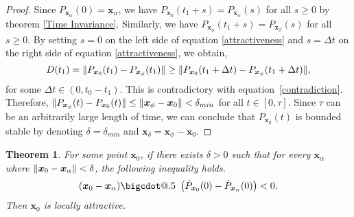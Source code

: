\documentclass{article}
\makeatletter
\newcommand{\B}[1]{\boldsymbol{#1}}
\newcommand*\bigcdot{\mathpalette\bigcdot@{.5}}
\newcommand*\bigcdot@[2]{\mathbin{\vcenter{\hbox{\scalebox{#2}{$\m@th#1\bullet$}}}}}
\DeclarePairedDelimiter\norm{\lVert}{\rVert}%
\newtheorem{theorem}{Theorem}[section]
\theoremstyle{definition}
\theoremstyle{remark}
\makeatother
\begin{document}
\begin{proof}
  Since $P_{\B{x}_\alpha}(0) = \B{x}_\alpha$, we have $P_{\B{x}_0}(t_1 + s) = P_{\B{x}_\alpha}(s)$   for all $s \geq 0$ by theorem \ref{Time Invariance}. Similarly, we have $P_{\B{x}_\phi}(t_1 + s) = P_{\B{x}_\beta}(s)$ for all $s \geq 0$. By setting $s=0$ on the left side 
  of equation \ref{attractiveness} and $s=\Delta t$ on the right side of equation \ref{attractiveness}, we obtain,
  $$
  D(t_1) = \norm{P_{\B{x}_0}(t_1) - P_{\B{x}_\phi}(t_1)} \geq \norm{P_{\B{x}_0}(t_1 + \Delta t) - P_{\B{x}_\phi}(t_1 + \Delta t)},
  $$
  for some $\Delta t \in \left(0, t_0 - t_1\right)$. This is contradictory with equation~\ref{contradiction}.  
  Therefore, $\norm{P_{\B{x}_\phi}(t)-P_{\B{x}_0}(t)} \leq \norm{\B{x}_\phi - \B{x}_0} < \delta_{min}$ for all
  $t \in [0, \tau]$. Since $\tau$ can be an arbitrarily large length of time, we can conclude that $P_{\B{x}_0}(t)$ is bounded stable by denoting
  $\delta=\delta_{min}$ and $\B{x}_\delta=\B{x}_\phi - \B{x}_0$.
\end{proof}

\begin{theorem}
  \label{Local Dot Product}
  For some point $\B{x}_0$, if there exists $\delta > 0$ such that for every
  $\B{x}_\alpha$ where $\norm{\B{x}_0 - \B{x}_\alpha} < \delta$, the following inequality holds.
  $$(\B{x}_0 - \B{x}_\alpha) \bigcdot~ \left(\dot{P}_{\B{x}_0}(0) - \dot{P}_{\B{x}_\alpha}(0)\right) < 0.$$
  Then $\B{x}_0$ is locally attractive.
\end{theorem}
\end{document}
